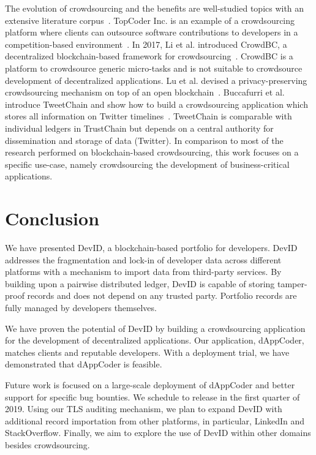 The evolution of crowdsourcing and the benefits are well-studied topics with an extensive literature corpus~\cite{latoza2016crowdsourcing}.
TopCoder Inc. is an example of a crowdsourcing platform where clients can outsource software contributions to developers in a competition-based environment~\cite{lakhani2010topcoder}.
In 2017, Li et al. introduced CrowdBC, a decentralized blockchain-based framework for crowdsourcing~\cite{li2017crowdbc}.
CrowdBC is a platform to crowdsource generic micro-tasks and is not suitable to crowdsource development of decentralized applications.
Lu et al. devised a privacy-preserving crowdsourcing mechanism on top of an open blockchain~\cite{lu2018zebralancer}.
Buccafurri et al. introduce TweetChain and show how to build a crowdsourcing application which stores all information on Twitter timelines~\cite{buccafurri2017tweetchain}.
TweetChain is comparable with individual ledgers in TrustChain but depends on a central authority for dissemination and storage of data (Twitter).
In comparison to most of the research performed on blockchain-based crowdsourcing, this work focuses on a specific use-case, namely crowdsourcing the development of business-critical applications.

\section{Conclusion}
We have presented DevID, a blockchain-based portfolio for developers.
DevID addresses the fragmentation and lock-in of developer data across different platforms with a mechanism to import data from third-party services.
By building upon a pairwise distributed ledger, DevID is capable of storing tamper-proof records and does not depend on any trusted party.
Portfolio records are fully managed by developers themselves.

We have proven the potential of DevID by building a crowdsourcing application for the development of decentralized applications.
Our application, dAppCoder, matches clients and reputable developers.
With a deployment trial, we have demonstrated that dAppCoder is feasible.

Future work is focused on a large-scale deployment of dAppCoder and better support for specific bug bounties.
We schedule to release in the first quarter of 2019.
Using our TLS auditing mechanism, we plan to expand DevID with additional record importation from other platforms, in particular, LinkedIn and StackOverflow.
Finally, we aim to explore the use of DevID within other domains besides crowdsourcing.